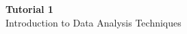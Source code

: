 \documentclass[12pt]{article}
\begin{document}
\begin{center}
  {\LARGE\bfseries Tutorial 1}\\[0.25em]
  {\large Introduction to Data Analysis Techniques}\\[0.15em]
\end{center}

\end{document}
